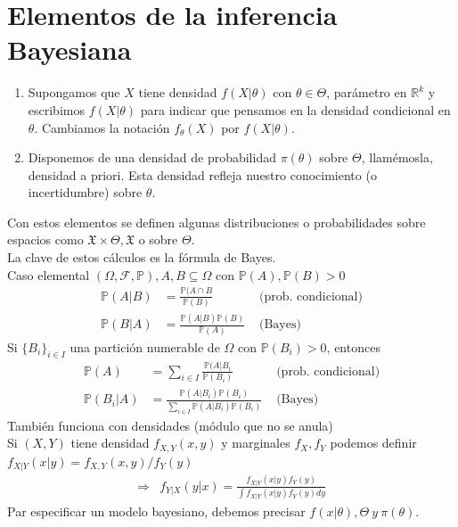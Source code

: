 \documentclass[10pt]{article}
\theoremstyle{plain}
\theoremstyle{definition}
\begin{document}
\section{Elementos de la inferencia Bayesiana}
\begin{enumerate}
\item Supongamos que $X$ tiene densidad $f(X|\theta)$ con $\theta \in \Theta$, parámetro en $\mathbb{R}^k$ y escribimos $f(X|\theta)$ para indicar que pensamos en la densidad condicional en $\theta$. Cambiamos la notación $f_{\theta}(X)$ por $f(X|\theta)$.
\item Disponemos de una densidad de probabilidad $\pi(\theta)$ sobre $\Theta$, llamémosla, densidad a priori. Esta densidad refleja nuestro conocimiento (o incertidumbre) sobre $\theta$.\\
\end{enumerate}
Con estos elementos se definen algunas distribuciones o probabilidades sobre espacios como $\mathfrak{X}\times\Theta,\mathfrak{X}$ o sobre $\Theta$.\\
La clave de estos cálculos es la fórmula de Bayes.\\
Caso elemental $(\Omega,\mathcal{F}, \mathbb{P}), A, B \subseteq \Omega$ con $\mathbb{P}(A), \mathbb{P}(B) >0$
\begin{align*}
\mathbb{P}(A|B) &= \frac{\mathbb{P}(A\cap B}{\mathbb{P}(B)}&\text{ (prob. condicional)}\\
\mathbb{P}(B|A) &= \frac{\mathbb{P}(A|B)\mathbb{P}(B)}{\mathbb{P}(A)} & \text{ (Bayes)}
\end{align*}
Si $\{B_{i}\}_{i\in I}$ una partición numerable de $\Omega$ con $\mathbb{P}(B_{i})>0$, entonces
\begin{align*}
\mathbb{P}(A) &= \sum_{i \in I}\frac{\mathbb{P}(A|B_{i}}{\mathbb{P}(B_{i})}&\text{ (prob. condicional)}\\
\mathbb{P}(B_{i}|A) &= \frac{\mathbb{P}(A|B_{i})\mathbb{P}(B_{i})}{\sum_{i\in I}\mathbb{P}(A|B_{i})\mathbb{P}(B_{i})} & \text{ (Bayes)}
\end{align*}
También funciona con densidades (módulo que no se anula)\\
Si $(X,Y)$ tiene densidad $f_{X,Y}(x,y)$ y marginales $f_{X}, f_{Y}$ podemos definir $f_{X|Y}(x|y) = f_{X,Y}(x,y)/f_{Y}(y)$
\begin{align*}
\Rightarrow & f_{Y|X}(y|x) = \frac{f_{X|Y}(x|y)f_{Y}(y)}{\int f_{X|Y}(x|y)f_{Y}(y) dy}
\end{align*}
Par especificar un modelo bayesiano, debemos precisar $f(x|\theta), \Theta\ y\ \pi(\theta)$.\\
\end{document}

